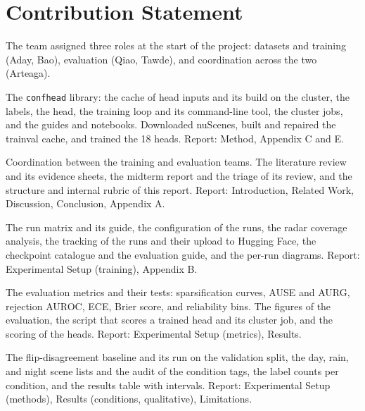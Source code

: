 %
\section*{Contribution Statement}

The team assigned three roles at the start of the project: datasets and training (Aday, Bao), evaluation (Qiao, Tawde), and coordination across the two (Arteaga). 

\begin{description}[leftmargin=1em, itemsep=3pt, topsep=4pt]
  \item[Nathan Aday.]  The \texttt{confhead} library: the cache of head inputs and its build on the cluster, the labels, the head, the training loop and its command-line tool, the cluster jobs, and the guides and notebooks. Downloaded nuScenes, built and repaired the trainval cache, and trained the 18 heads. Report: Method, Appendix C and E.
  \item[Alejandro Arteaga.]  Coordination between the training and evaluation teams. The literature review and its evidence sheets, the midterm report and the triage of its review, and the structure and internal rubric of this report. Report: Introduction, Related Work, Discussion, Conclusion, Appendix A.
  \item[Nathan Bao.]  The run matrix and its guide, the configuration of the runs, the radar coverage analysis, the tracking of the runs and their upload to Hugging Face, the checkpoint catalogue and the evaluation guide, and the per-run diagrams. Report: Experimental Setup (training), Appendix B.
  \item[Katherine Qiao.]  The evaluation metrics and their tests: sparsification curves, AUSE and AURG, rejection AUROC, ECE, Brier score, and reliability bins. The figures of the evaluation, the script that scores a trained head and its cluster job, and the scoring of the heads. Report: Experimental Setup (metrics), Results.
  \item[Varad Jaideep Tawde.]  The flip-disagreement baseline and its run on the validation split, the day, rain, and night scene lists and the audit of the condition tags, the label counts per condition, and the results table with intervals. Report: Experimental Setup (methods), Results (conditions, qualitative), Limitations.
\end{description}


